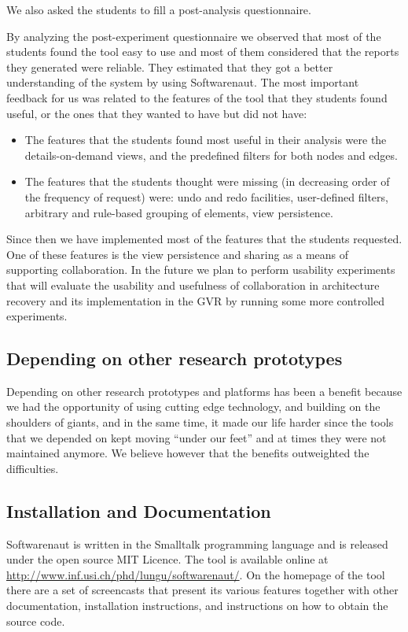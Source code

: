 \documentclass[preprint,12pt]{elsarticle}
\begin{document}
We also asked the students to fill a post-analysis questionnaire. 

By analyzing the post-experiment questionnaire we observed that most of the students found the tool easy to use and most of them considered that the reports they generated were reliable. They estimated that they got a better understanding of the system by using Softwarenaut. The most important feedback for us was related to the features of the tool that they students found useful, or the ones that they wanted to have but did not have:

\begin{itemize}
\item The features that the students found most useful in their analysis were the details-on-demand views, and the predefined filters for both nodes and edges.
\item The features that the students thought were missing (in decreasing order of the frequency of request) were: undo and redo facilities, user-defined filters, arbitrary and rule-based grouping of elements, view persistence.

\end{itemize}

Since then we have implemented most of the features that the students requested. One of these features is the view persistence and sharing as a means of supporting collaboration. In the future we plan to perform usability experiments that will evaluate the usability and usefulness of collaboration in architecture recovery and its implementation in the GVR by running some more controlled experiments.



\subsection {Depending on other research prototypes}
Depending on other research prototypes and platforms has been a benefit because we had the opportunity of using cutting edge technology, and building on the shoulders of giants, and in the same time, it made our life harder since the tools that we depended on kept moving ``under our feet'' and at times they were not maintained anymore. We believe however that the benefits outweighted the difficulties.


\subsection {Installation and Documentation}
Softwarenaut is written in the Smalltalk programming language and is released under the open source MIT Licence. The tool is available online at {\footnotesize \url{http://www.inf.usi.ch/phd/lungu/softwarenaut/}}. On the homepage of the tool there are a set of screencasts that present its various features together with other documentation, installation instructions, and instructions on how to obtain the source code. 
\end{document}
